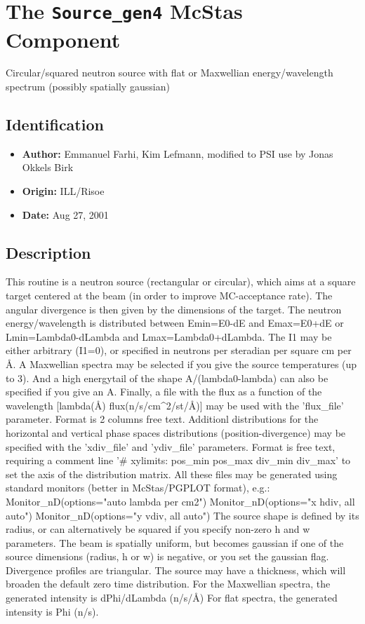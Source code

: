 \section{The \texttt{Source\_gen4} McStas Component}
Circular/squared neutron source with flat or Maxwellian energy/wavelength
spectrum (possibly spatially gaussian)

\subsection*{Identification}
\begin{itemize}
  \item \textbf{Author:} Emmanuel Farhi, Kim Lefmann, modified to PSI use by Jonas Okkels Birk
  \item \textbf{Origin:} ILL/Risoe
  \item \textbf{Date:} Aug 27, 2001
\end{itemize}

\subsection*{Description}
This routine is a neutron source (rectangular or circular), which aims at a square target centered at the beam (in order to improve MC-acceptance rate). The angular divergence is then given by the dimensions of the target. The neutron energy/wavelength is distributed between Emin=E0-dE and Emax=E0+dE or Lmin=Lambda0-dLambda and Lmax=Lambda0+dLambda. The I1 may be either arbitrary (I1=0), or specified in neutrons per steradian per square cm per \AA{}. A Maxwellian spectra may be selected if you give the source temperatures (up to 3). And a high energytail of the shape A/(lambda0-lambda) can also be specified if you give an A. Finally, a file with the flux as a function of the wavelength [lambda(\AA{}) flux(n/s/cm\textasciicircum{}2/st/\AA{})] may be used with the 'flux\_file' parameter. Format is 2 columns free text. Additionl distributions for the horizontal and vertical phase spaces distributions (position-divergence) may be specified with the 'xdiv\_file' and 'ydiv\_file' parameters. Format is free text, requiring a comment line '\# xylimits: pos\_min pos\_max div\_min div\_max' to set the axis of the distribution matrix. All these files may be generated using standard monitors (better in McStas/PGPLOT format), e.g.: Monitor\_nD(options="auto lambda per cm2") Monitor\_nD(options="x hdiv, all auto") Monitor\_nD(options="y vdiv, all auto") The source shape is defined by its radius, or can alternatively be squared if you specify non-zero h and w parameters. The beam is spatially uniform, but becomes gaussian if one of the source dimensions (radius, h or w) is negative, or you set the gaussian flag. Divergence profiles are triangular. The source may have a thickness, which will broaden the default zero time distribution. For the Maxwellian spectra, the generated intensity is dPhi/dLambda (n/s/\AA{}) For flat spectra, the generated intensity is Phi (n/s).


